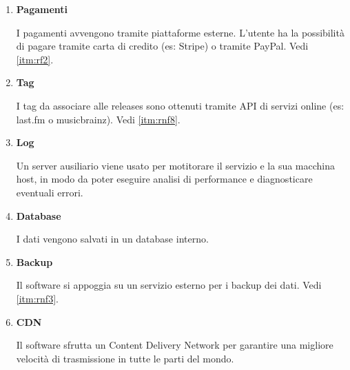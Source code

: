 \documentclass[a4paper,12pt]{article}
\begin{document}
\begin{enumerate}[label=\textbf{BE\arabic*}\;, ref=\textbf{BE\arabic*}]
    \item \label{itm:be1} \textbf{Pagamenti}
    
    I pagamenti avvengono tramite piattaforme esterne. L'utente ha la possibilità di pagare tramite carta di credito (es: Stripe) o tramite PayPal. Vedi \ref{itm:rf2}.
    \item \label{itm:be2} \textbf{Tag}
    
    I tag da associare alle releases sono ottenuti tramite API di servizi online (es: last.fm o musicbrainz). Vedi \ref{itm:rnf8}.
    \item \label{itm:be3} \textbf{Log}
    
    Un server ausiliario viene usato per motitorare il servizio e la sua macchina host, in modo da poter eseguire analisi di performance e diagnosticare eventuali errori.
    \item \label{itm:be4} \textbf{Database}
    
    I dati vengono salvati in un database interno.
    \item \label{itm:be5} \textbf{Backup}
    
    Il software si appoggia su un servizio esterno per i backup dei dati. Vedi \ref{itm:rnf3}.
    \item \label{itm:be6} \textbf{CDN}
    
    Il software sfrutta un Content Delivery Network per garantire una migliore velocità di trasmissione in tutte le parti del mondo.
\end{enumerate}

\end{document}
